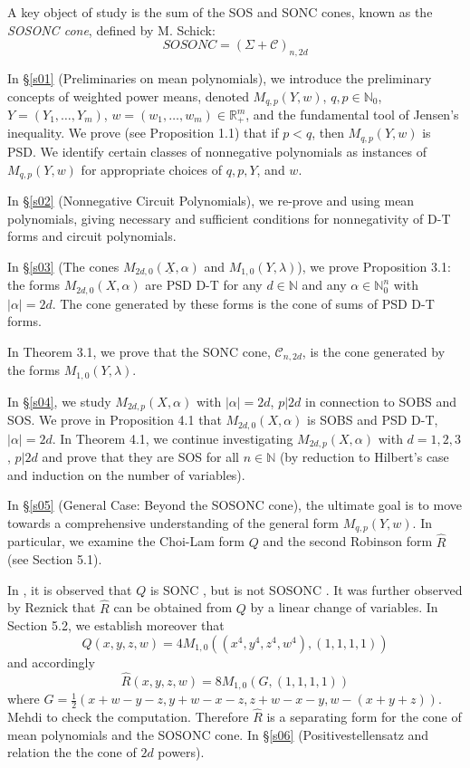 \documentclass{article}
\begin{document}
A key object of study is the sum of the SOS and SONC cones, known as the \emph{SOSONC cone}, defined by M. Schick:
\[
   SOSONC = (\Sigma + \mathcal{C})_{n,2d}
\]

In \S\ref{s01} (Preliminaries on mean polynomials), we introduce the preliminary concepts of weighted power means,
denoted $M_{q,p}(Y,w)$, $q, p \in \mathbb{N}_0$, $Y = (Y_1, \dots, Y_m)$, $w = (w_1, \dots, w_m) \in \mathbb{R}_+^m$, and
the fundamental tool of Jensen's inequality. We prove (see Proposition 1.1) that if $p < q$, then $M_{q,p}(Y,w)$ is PSD.
We identify certain classes of nonnegative polynomials as instances of $M_{q,p}(Y,w)$ for appropriate choices of $q, p, Y$,
and $w$.

In \S\ref{s02} (Nonnegative Circuit Polynomials), we re-prove \cite[Corolary 2.2]{GM01} and \cite[Theorem 2.4]{DIdW01}
using mean polynomials, giving necessary and sufficient conditions for nonnegativity of D-T forms and circuit polynomials.

In \S\ref{s03} (The cones $M_{2d,0}(\underline{X},\alpha)$ and $M_{1,0}(Y,\lambda)$), we prove Proposition 3.1: the
forms $M_{2d,0}(X,\alpha)$ are PSD D-T for any $d \in \mathbb{N}$ and any $\alpha \in \mathbb{N}_0^n$ with $|\alpha| = 2d$.
The cone generated by these forms is the cone of sums of PSD D-T forms.

In Theorem 3.1, we prove that the SONC cone, $\mathcal{C}_{n,2d}$, is the cone generated by the forms $M_{1,0}(Y,\lambda)$.

In \S\ref{s04}, we study $M_{2d,p}(X,\alpha)$ with $|\alpha| = 2d$, $p | 2d$ in connection to SOBS and SOS. We prove
in Proposition 4.1 that $M_{2d,0}(X,\alpha)$ is SOBS and PSD D-T, $|\alpha| = 2d$. In Theorem 4.1, we continue investigating
$M_{2d,p}(X,\alpha)$ with $d = 1, 2, 3$, $p | 2d$ and prove that they are SOS for all $n \in \mathbb{N}$ (by reduction to
Hilbert's case and induction on the number of variables).

In \S\ref{s05} (General Case: Beyond the SOSONC cone), the ultimate goal is to move towards a comprehensive
understanding of the general form $M_{q,p}(Y,w)$. In particular, we examine the Choi-Lam form $Q$ and the second Robinson
form $\hat{R}$ (see Section 5.1).

In \cite{MSc01}, it is observed that $Q$ is SONC \cite[page 31]{MSc01}, but is not SOSONC \cite[Lemma 4.2.5, page 107]{MSc01}.
It was further observed by Reznick \cite{Rez07} that $\hat{R}$ can be obtained from $Q$ by a linear change of variables.
In Section 5.2, we establish moreover that
\[
   Q(x, y, z, w) = 4 M_{1,0}((x^4, y^4, z^4, w^4), (1, 1, 1, 1))
\]
and accordingly
$$\hat{R}(x,y,z,w)=8M_{1,0}(G, (1,1,1,1))$$
where $G=\frac{1}{2}(x+w-y-z, y+w-x-z, z+w-x-y, w-(x+y+z))$. Mehdi to check the computation.
Therefore $\hat{R}$ is a separating form for the cone of mean polynomials and the SOSONC cone.
In \S\ref{s06} (Positivestellensatz and relation the the cone of $2d$ powers).
\end{document}
